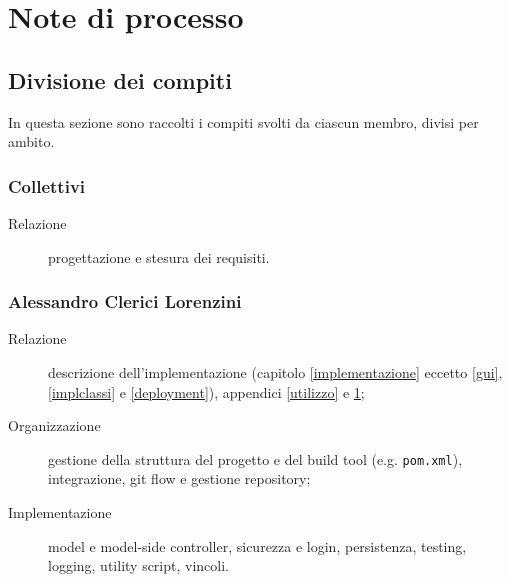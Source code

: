%
%
%
%


\chapter{Note di processo}\label{processo}




\section{Divisione dei compiti}
In questa sezione sono raccolti i compiti svolti da ciascun membro, divisi per ambito.


\subsection{Collettivi}
\begin{description}
	\item[Relazione] progettazione e stesura dei requisiti.
\end{description}


\subsection{Alessandro Clerici Lorenzini}
\begin{description}
	\item[Relazione] descrizione dell'implementazione (capitolo \ref{implementazione} eccetto \ref{gui}, \ref{implclassi} e \ref{deployment}), appendici \ref{utilizzo} e \ref{processo};
	\item[Organizzazione] gestione della struttura del progetto e del build tool (e.g. \verb!pom.xml!), integrazione, git flow e gestione repository;
	\item[Implementazione] model e model-side controller, sicurezza e login, persistenza, testing, logging, utility script, vincoli.
\end{description}


